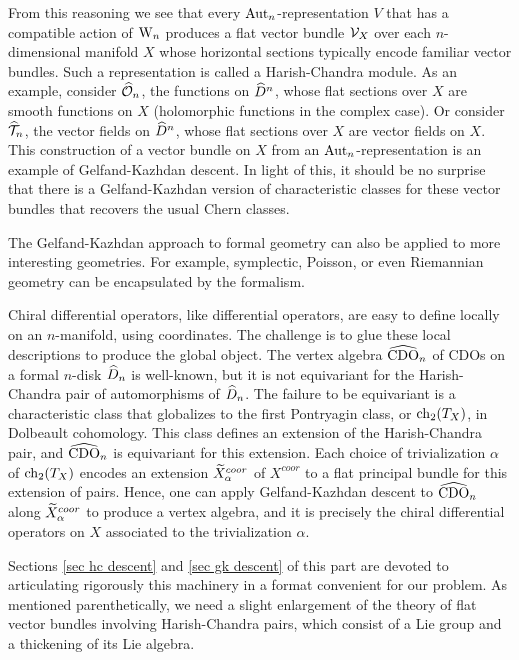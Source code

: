 From this reasoning we see that every $\Aut_n$-representation $V$ that has a compatible action of $\Vect$ produces a flat vector bundle $\cV_X$ over each $n$-dimensional manifold $X$ whose horizontal sections typically encode familiar vector bundles. Such a representation is called a Harish-Chandra module. As an example, consider $\hO_n$, the functions on $\hD^n$, whose flat sections over $X$ are smooth functions on $X$ (holomorphic functions in the complex case). Or consider $\hT_n$, the vector fields on $\hD^n$, whose flat sections over $X$ are vector fields on $X$. This construction of a vector bundle on $X$ from an $\Aut_n$-representation is an example of Gelfand-Kazhdan descent. In light of this, it should be no surprise that there is a Gelfand-Kazhdan version of characteristic classes for these vector bundles that recovers the usual Chern classes.

\begin{rmk} The Gelfand-Kazhdan approach to formal geometry can also be applied to more interesting geometries. For example, symplectic, Poisson, or even Riemannian geometry can be encapsulated by the formalism.
\end{rmk}

Chiral differential operators, like differential operators, are easy to define locally on an $n$-manifold, using coordinates. The challenge is to glue these local descriptions to produce the global object. The vertex algebra $\hCDO_n$ of CDOs on a formal $n$-disk $\hD_n$ is well-known, but it is not equivariant for the Harish-Chandra pair of automorphisms of $\hD_n$. The failure to be equivariant is a characteristic class that globalizes to the first Pontryagin class, or $\ch_2(T_X)$, in Dolbeault cohomology. This class defines an extension of the Harish-Chandra pair, and $\hCDO_n$ is equivariant for this extension. Each choice of trivialization $\alpha$ of $\ch_2(T_X)$ encodes an extension $\Tilde{X}^{coor}_\alpha$ of $X^{coor}$ to a flat principal bundle for this extension of pairs. Hence, one can apply Gelfand-Kazhdan descent to $\hCDO_n$ along $\Tilde{X}^{coor}_\alpha$ to produce a vertex algebra, and it is precisely the chiral differential operators on $X$ associated to the trivialization $\alpha$.

Sections \ref{sec hc descent} and \ref{sec gk descent} of this part are devoted to articulating rigorously this machinery in a format convenient for our problem. As mentioned parenthetically, we need a slight enlargement of the theory of flat vector bundles involving Harish-Chandra pairs, which consist of a Lie group and a thickening of its Lie algebra.

